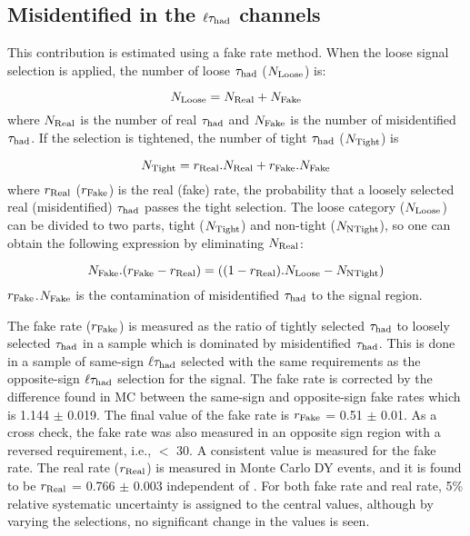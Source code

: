 \subsection{\texorpdfstring{Misidentified \Tau in the $\ell\tau_{\rm had}$ channels}{Misidentified tau in the lepton-tau channels}}
\label{sect:bkgFake}
This contribution is estimated using a fake rate method.
When the loose signal selection is applied, the number of loose $\tau_{\rm had}$ ($N_{\rm Loose}$) is:

\begin{equation}
N_{\rm Loose} = N_{\rm Real} + N_{\rm Fake}
\end{equation}
where $N_{\rm Real}$ is the number of real $\tau_{\rm had}$ and $N_{\rm Fake}$ is the number of misidentified 
$\tau_{\rm had}$. If the selection is tightened, the number of tight $\tau_{\rm had}$ ($N_{\rm Tight}$) is

\begin{equation}
 N_{\rm Tight} = r_{\rm Real}.N_{\rm Real} + r_{\rm Fake}.N_{\rm Fake}
\end{equation} 
where $r_{\rm Real}$ ($r_{\rm Fake}$) is the real (fake) rate, the probability that a loosely selected real (misidentified) $\tau_{\rm had}$ passes the  tight  selection. 
The loose category ($N_{\rm Loose}$) can be divided to two parts, 
tight ($N_{\rm Tight}$) and non-tight ($N_{\rm NTight}$), so one can obtain the following expression by eliminating $N_{\rm Real}$:

\begin{equation}
   N_{\rm Fake}.(r_{\rm Fake}-r_{\rm Real}) = ((1 - r_{\rm Real}).N_{\rm Loose}  - N_{\rm NTight})
\end{equation}
$r_{\rm Fake}$.$N_{\rm Fake}$ is the contamination of misidentified $\tau_{\rm had}$ to the signal region. 

The fake rate ($r_{\rm Fake}$) is measured as the ratio of tightly selected $\tau_{\rm had}$ to loosely 
selected $\tau_{\rm had}$ in a sample which is dominated by misidentified $\tau_{\rm had}$. This is done in a sample of same-sign $\ell\tau_{\rm had}$ selected 
with the same requirements as the opposite-sign $\ell\tau_{\rm had}$
selection for the signal.
The fake rate is corrected by the difference found in MC between the 
same-sign and opposite-sign fake rates which is 1.144 $\pm$ 0.019.
The final value of the fake rate is $r_{\rm Fake}$ = 0.51 $\pm$ 0.01. 
As a cross check, the fake rate was also measured in an opposite sign region with a reversed
\MPT requirement, i.e., \MPT $<$ 30\GeV.
A consistent value is measured for the fake rate.  
The real rate ($r_{\rm Real}$) is measured in Monte Carlo DY events, and it is found to 
be $r_{\rm Real}$ = 0.766 $\pm$ 0.003 independent of \mttwo. 
For both fake rate and real rate, 5\% relative systematic uncertainty is assigned to the central values, although 
by varying the selections, no significant change in the values is seen.

